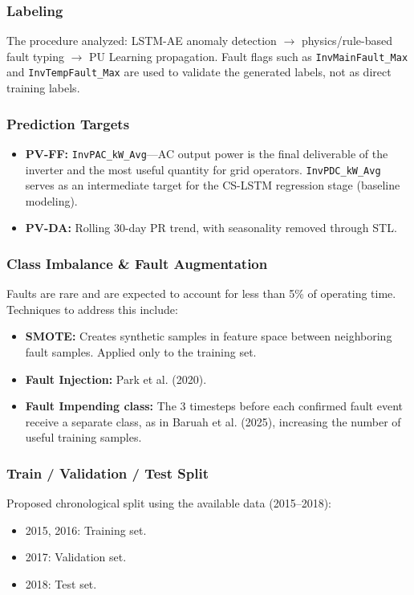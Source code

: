\documentclass[11pt,a4paper]{article}
\begin{document}
\subsubsection*{Labeling}
The procedure analyzed: LSTM-AE anomaly detection $\rightarrow$ physics/rule-based fault typing $\rightarrow$ PU Learning propagation. Fault flags such as \texttt{InvMainFault\_Max} and \texttt{InvTempFault\_Max} are used to validate the generated labels, not as direct training labels.

\subsubsection*{Prediction Targets}
\begin{itemize}
    \item \textbf{PV-FF:} \texttt{InvPAC\_kW\_Avg}---AC output power is the final deliverable of the inverter and the most useful quantity for grid operators. \texttt{InvPDC\_kW\_Avg} serves as an intermediate target for the CS-LSTM regression stage (baseline modeling).
    \item \textbf{PV-DA:} Rolling 30-day PR trend, with seasonality removed through STL.
\end{itemize}

\subsubsection*{Class Imbalance \& Fault Augmentation}
Faults are rare and are expected to account for less than 5\% of operating time. Techniques to address this include:
\begin{itemize}
    \item \textbf{SMOTE:} Creates synthetic samples in feature space between neighboring fault samples. Applied only to the training set.
    \item \textbf{Fault Injection:} Park et al. (2020).
    \item \textbf{Fault Impending class:} The 3 timesteps before each confirmed fault event receive a separate class, as in Baruah et al. (2025), increasing the number of useful training samples.
\end{itemize}

\subsubsection*{Train / Validation / Test Split}
Proposed chronological split using the available data (2015--2018):
\begin{itemize}
    \item 2015, 2016: Training set.
    \item 2017: Validation set.
    \item 2018: Test set.
\end{itemize}
\end{document}
